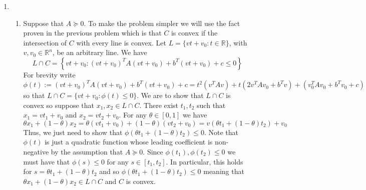 \documentclass[11pt]{amsart}
\begin{document}
\begin{enumerate}
\item \begin{enumerate}
\item Suppose that $A \succeq 0$.  To make the problem simpler we will use the fact proven in the previous problem which is that $C$ is convex if the intersection of $C$ with every line is convex.  Let $L = \{vt + v_0: t\in \mathbb{R}\}$, with $v,v_0\in \mathbb{R}^n$, be an arbitrary line.  We have
\[
L\cap C = \left\{ vt+v_0 : (vt+v_0)^TA(vt+v_0) + b^T(vt+v_0) + c \le 0 \right\}
\]
For brevity write
\[
\phi(t) :=(vt+v_0)^TA(vt+v_0) + b^T(vt+v_0) + c = t^2 (v^TAv) + t(2v^TAv_0 + b^Tv) + (v_0^TAv_0 + b^Tv_0 + c)
\]
so that $L\cap C = \{vt+v_0 : \phi(t) \le 0\}$.  We are to show that $L\cap C$ is convex so suppose that $x_1,x_2 \in L\cap C$.  There exist $t_1,t_2$ such that $x_1 = vt_1 + v_0$ and $x_2 = vt_2 + v_0$.  For any $\theta \in [0,1]$ we have
\[
\theta x_1 + (1-\theta)x_2 = \theta (vt_1+v_0) + (1-\theta)(vt_2+v_0) = v(\theta t_1 + (1-\theta)t_2) + v_0
\]
Thus, we just need to show that $\phi(\theta t_1 + (1-\theta)t_2) \le 0$.  Note that $\phi(t)$ is just a quadratic function whose leading coefficient is non-negative by the assumption that $A \succeq 0$.  Since $\phi(t_1),\phi(t_2) \le 0$ we must have that $\phi(s) \le 0$ for any $s \in [t_1,t_2]$.  In particular, this holds for $s = \theta t_1 + (1-\theta)t_2$ and so $\phi(\theta t_1 + (1-\theta)t_2) \le 0$ meaning that $\theta x_1 + (1-\theta)x_2 \in L\cap C$ and $C$ is convex.

\vspace{0.25in}


\end{enumerate}
\end{enumerate}
\end{document}
